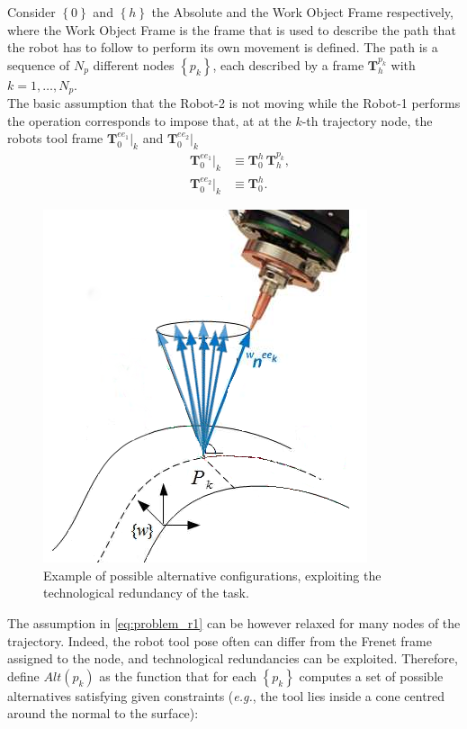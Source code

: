 \documentclass[twocolumn]{svjour3}
\newcommand{\Tr}[2]{\mathbf{T}^{#2}_{#1}}
\newcommand{\ToolRk}[2]{\Tr{#1}{ee_#2}|_k}
\newcommand{\ToolRAk}[1]{\ToolRk{#1}{1}}
\newcommand{\ToolRBk}[1]{\ToolRk{#1}{2}}
\newcommand{\rev}[1]{\textcolor{verde}{#1}}
\begin{document}
Consider $\left\{0\right\}$ and $\left\{h\right\}$ the Absolute and the Work Object Frame respectively, where the Work Object Fra\-me is the frame that is used to describe the path that the robot has to follow to perform its own movement is defined. 
The path is a sequence of $N_{p}$ different nodes $\left\{p_k\right\}$, each described by a frame $\Tr{h}{p_k}$ with $k=1,\ldots, N_p$.\\
The basic assumption that the Robot-2 is not moving while the Robot-1 performs the operation corresponds to impose that, at at the $k$-th trajectory node, the robots tool frame $\ToolRAk{0}$ and $\ToolRBk{0}$
\begin{subequations}\label{eq:problem}
\begin{align}
\quad\ToolRAk{0} & \equiv \Tr{0}{h}\,\Tr{h}{p_{k}}\label{eq:problem_r1},\\
\quad\ToolRBk{0} & \equiv \Tr{0}{h} \label{eq:problem_r2}.
\end{align}
\end{subequations}
%
\begin{figure}[t]
\centering
  \includegraphics[trim={0 0.65cm 0 0.65cm},clip, width=.7\linewidth]{red_cone.png}
  \caption{Example of possible alternative configurations, exploiting the technological redundancy of the task.}
\end{figure}
%
\noindent The assumption in \eqref{eq:problem_r1} can be however relaxed for many nodes of the trajectory. Indeed, the robot tool pose often can differ from the Frenet frame assigned to the node, and technological redundancies can be exploited. Therefore, define $Alt\left( p_k \right)$ as the function that for each $\left\{p_k\right\}$  computes a set of possible alternatives satisfying given constraints (\textit{e.g.}, the tool lies inside a cone centred around the normal to the surface):
\end{document}
